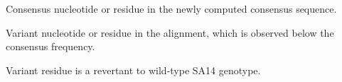 \documentclass{report}
\begin{document}
\begin{table}[h]

		\centering
		\begin{ThreePartTable}
			
			\caption{Amino acid variants concordantly observed in both SA14-14-2/P1 and SA14-14-2/P2, 
				relative to the newly sequenced SA14 strain.}
			
			\label{my-label}
			
			\begin{tablenotes}
				\item[a] Consensus nucleotide or residue in the newly computed consensus sequence.
				\item[b] Variant nucleotide or residue in the alignment, which is observed below the consensus frequency.
				\item[c] Variant residue is a revertant to wild-type SA14 genotype.

			\end{tablenotes}
		\end{ThreePartTable}
\end{table}
\end{document}
